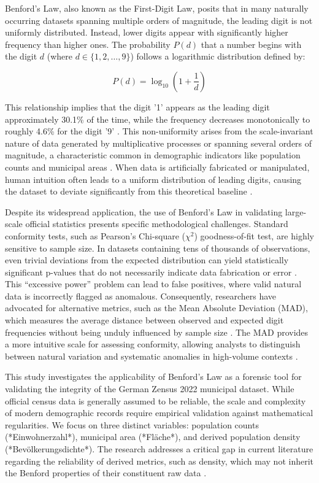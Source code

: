 \documentclass[11pt,a4paper]{article}
\begin{document}
Benford's Law, also known as the First-Digit Law, posits that in many naturally occurring datasets spanning multiple orders of magnitude, the leading digit is not uniformly distributed. Instead, lower digits appear with significantly higher frequency than higher ones. The probability $P(d)$ that a number begins with the digit $d$ (where $d \in \{1, 2, \dots, 9\}$) follows a logarithmic distribution defined by:

$$ P(d) = \log_{10}\left(1 + \frac{1}{d}\right) $$

This relationship implies that the digit '1' appears as the leading digit approximately 30.1\% of the time, while the frequency decreases monotonically to roughly 4.6\% for the digit '9' \cite{Miller2015BenfordsLT}. This non-uniformity arises from the scale-invariant nature of data generated by multiplicative processes or spanning several orders of magnitude, a characteristic common in demographic indicators like population counts and municipal areas \cite{Ivanova2025BenfordsLA}. When data is artificially fabricated or manipulated, human intuition often leads to a uniform distribution of leading digits, causing the dataset to deviate significantly from this theoretical baseline \cite{Petras2025DetectingBL}.

Despite its widespread application, the use of Benford's Law in validating large-scale official statistics presents specific methodological challenges. Standard conformity tests, such as Pearson's Chi-square ($\chi^2$) goodness-of-fit test, are highly sensitive to sample size. In datasets containing tens of thousands of observations, even trivial deviations from the expected distribution can yield statistically significant p-values that do not necessarily indicate data fabrication or error \cite{Cerqueti2021SomeNT}. This ``excessive power'' problem can lead to false positives, where valid natural data is incorrectly flagged as anomalous. Consequently, researchers have advocated for alternative metrics, such as the Mean Absolute Deviation (MAD), which measures the average distance between observed and expected digit frequencies without being unduly influenced by sample size \cite{Kossler2024SomeNI}. The MAD provides a more intuitive scale for assessing conformity, allowing analysts to distinguish between natural variation and systematic anomalies in high-volume contexts \cite{Azevedo2021ABL}.

This study investigates the applicability of Benford's Law as a forensic tool for validating the integrity of the German Zensus 2022 municipal dataset. While official census data is generally assumed to be reliable, the scale and complexity of modern demographic records require empirical validation against mathematical regularities. We focus on three distinct variables: population counts (*Einwohnerzahl*), municipal area (*Fläche*), and derived population density (*Bevölkerungsdichte*). The research addresses a critical gap in current literature regarding the reliability of derived metrics, such as density, which may not inherit the Benford properties of their constituent raw data \cite{Druica2018BenfordsLA}.
\end{document}
